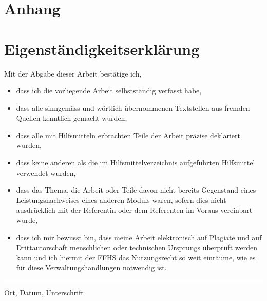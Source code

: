 \appendix
\chapter*{Anhang}
\setcounter{section}{0}
\setcounter{listing}{0}
\renewcommand{\thesection}{\Alph{section}}
\renewcommand{\thelisting}{(\alph{listing})}



\chapter*{Eigenständigkeitserklärung}
Mit der Abgabe dieser Arbeit bestätige ich,

\begin{itemize}
    \item dass ich die vorliegende Arbeit selbstständig verfasst habe,
    \item dass alle sinngemäss und wörtlich übernommenen Textstellen aus fremden Quellen kenntlich gemacht wurden,
    \item dass alle mit Hilfsmitteln erbrachten Teile der Arbeit präzise deklariert wurden,
    \item dass keine anderen als die im Hilfsmittelverzeichnis aufgeführten Hilfsmittel verwendet wurden,
    \item dass das Thema, die Arbeit oder Teile davon nicht bereits Gegenstand eines Leistungsnachweises eines anderen Moduls waren, sofern dies nicht ausdrücklich mit der Referentin oder dem Referenten im Voraus vereinbart wurde,
    \item dass ich mir bewusst bin, dass meine Arbeit elektronisch auf Plagiate und auf Drittautorschaft menschlichen oder technischen Ursprungs überprüft werden kann und ich hiermit der FFHS das Nutzungsrecht so weit einräume, wie es für diese Verwaltungshandlungen notwendig ist.
\end{itemize}

\vspace{1.5cm}
\noindent\rule{\textwidth}{0.4pt}
\noindent Ort, Datum, Unterschrift

